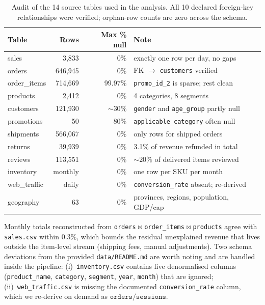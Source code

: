 \documentclass{article}
\begin{document}
\begin{table}[h]
  \caption{Audit of the 14 source tables used in the analysis. All 10 declared foreign-key relationships were verified; orphan-row counts are zero across the schema.}
  \label{tab:audit}
  \centering
  \small
  \begin{tabular}{@{}l r r l@{}}
    \toprule
    \textbf{Table} & \textbf{Rows} & \textbf{Max \% null} & \textbf{Note} \\
    \midrule
    sales          & 3{,}833    & 0\%    & exactly one row per day, no gaps \\
    orders         & 646{,}945  & 0\%    & FK $\to$ \texttt{customers} verified \\
    order\_items   & 714{,}669  & 99.97\% & \texttt{promo\_id\_2} is sparse; rest clean \\
    products       & 2{,}412    & 0\%    & 4 categories, 8 segments \\
    customers      & 121{,}930  & $\sim\!30\%$ & \texttt{gender} and \texttt{age\_group} partly null \\
    promotions     & 50         & 80\%   & \texttt{applicable\_category} often null \\
    shipments      & 566{,}067  & 0\%    & only rows for shipped orders \\
    returns        & 39{,}939   & 0\%    & 3.1\% of revenue refunded in total \\
    reviews        & 113{,}551  & 0\%    & $\sim\!20\%$ of delivered items reviewed \\
    inventory      & monthly    & 0\%    & one row per SKU per month \\
    web\_traffic   & daily      & 0\%    & \texttt{conversion\_rate} absent; re-derived \\
    geography      & 63         & 0\%    & provinces, regions, population, GDP/cap \\
    \bottomrule
  \end{tabular}
\end{table}

Monthly totals reconstructed from \texttt{orders}$\bowtie$\texttt{order\_items}$\bowtie$\texttt{products} agree with \texttt{sales.csv} within 0.3\%, which bounds the residual unexplained revenue that lives outside the item-level stream (shipping fees, manual adjustments). Two schema deviations from the provided \texttt{data/README.md} are worth noting and are handled inside the pipeline: (i)~\texttt{inventory.csv} contains five denormalised columns (\texttt{product\_name}, \texttt{category}, \texttt{segment}, \texttt{year}, \texttt{month}) that are ignored; (ii)~\texttt{web\_traffic.csv} is missing the documented \texttt{conversion\_rate} column, which we re-derive on demand as $\mathtt{orders}/\mathtt{sessions}$.
\end{document}
